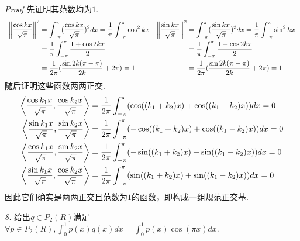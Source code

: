 \textit{Proof}
先证明其范数均为\(1\).
    \begin{equation*}
        \begin{array}{cc}
            \begin{aligned}
                \left\lVert \dfrac{\cos kx}{\sqrt{\pi}} \right\rVert^2 &= \int_{-\pi}^{\pi}(\dfrac{\cos kx}{\sqrt{\pi}})^2dx
                =\dfrac{1}{\pi} \int_{-\pi}^{\pi} \cos^2 kx \\
                &=\dfrac{1}{\pi} \int_{-\pi}^{\pi} \dfrac{1+\cos 2kx}{2} \\
                &=\dfrac{1}{2\pi}(\dfrac{\sin 2k(\pi-\pi)}{2k}+2\pi)=1
            \end{aligned}
            &
            \begin{aligned}
                \left\lVert \dfrac{\sin kx}{\sqrt{\pi}} \right\rVert^2 &= \int_{-\pi}^{\pi}(\dfrac{\sin kx}{\sqrt{\pi}})^2dx
                =\dfrac{1}{\pi} \int_{-\pi}^{\pi} \sin^2 kx \\
                &=\dfrac{1}{\pi} \int_{-\pi}^{\pi} \dfrac{1-\cos 2kx}{2} \\
                &=\dfrac{1}{2\pi}(\dfrac{\sin 2k(\pi-\pi)}{2k}+2\pi)=1
            \end{aligned}
        \end{array}
    \end{equation*}
随后证明这些函数两两正交.
    \begin{align*}
        \left\langle \dfrac{\cos k_1x}{\sqrt{\pi}},\dfrac{\cos k_2x}{\sqrt{\pi}} \right\rangle&
        =\dfrac{1}{2\pi} \int_{-\pi}^{\pi}(\cos((k_1+k_2)x)+\cos((k_1-k_2)x))dx=0 \\
        \left\langle \dfrac{\sin k_1x}{\sqrt{\pi}},\dfrac{\sin k_2x}{\sqrt{\pi}} \right\rangle&
        =\dfrac{1}{2\pi} \int_{-\pi}^{\pi}(-\cos((k_1+k_2)x)+\cos((k_1-k_2)x))dx=0 \\
        \left\langle \dfrac{\cos k_1x}{\sqrt{\pi}},\dfrac{\sin k_2x}{\sqrt{\pi}} \right\rangle&
        =\dfrac{1}{2\pi} \int_{-\pi}^{\pi}(-\sin((k_1+k_2)x)+\sin((k_1-k_2)x))dx=0 \\
        \left\langle \dfrac{\sin k_1x}{\sqrt{\pi}},\dfrac{\cos k_2x}{\sqrt{\pi}} \right\rangle&
        =\dfrac{1}{2\pi} \int_{-\pi}^{\pi}(\sin((k_1+k_2)x)+\sin((k_1-k_2)x))dx=0 \\
    \end{align*}
因此它们确实是两两正交且范数为\(1\)的函数，即构成一组规范正交基.

\newpage

\textit{8.}
给出\(q \in P_2(R)\)满足\(\forall p \in P_2(R),\int_{0}^{1} p(x)q(x)dx=\int_{0}^{1} p(x)\cos(\pi x)dx\).

